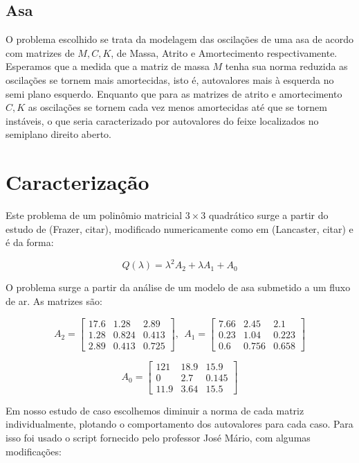 \documentclass[10pt,journal,compsoc]{IEEEtran}
\begin{document}
\subsection{Asa}
O problema escolhido se trata da modelagem das oscilações de uma asa de acordo com matrizes de $M,C,K$, de Massa, Atrito e Amortecimento respectivamente. Esperamos que a medida que a matriz de massa $M$ tenha sua norma reduzida as oscilações se tornem mais amortecidas, isto é, autovalores mais à esquerda no semi plano esquerdo. Enquanto que para as matrizes de atrito e amortecimento $C,K$ as oscilações se tornem cada vez menos amortecidas até que se tornem instáveis, o que seria caracterizado por autovalores do feixe localizados no semiplano direito aberto.


\section{Caracterização}
Este problema de um polinômio matricial $3\times3$ quadrático surge a partir do estudo de (Frazer, citar), modificado numericamente como em (Lancaster, citar) e é da forma:

\[
Q(\lambda) = \lambda^2A_2 + \lambda A_1 + A_0
\]

O problema surge a partir da análise de um modelo de asa submetido a um fluxo de ar. As matrizes são:

\[
A_2 = \begin{bmatrix}
17.6 & 1.28 & 2.89\\
1.28 & 0.824 & 0.413\\
2.89 & 0.413 & 0.725
\end{bmatrix}
,~~
A_1 = \begin{bmatrix}
7.66 & 2.45 & 2.1 \\
0.23 & 1.04 & 0.223\\
0.6 & 0.756 & 0.658
\end{bmatrix}
\]

\[
A_0 = \begin{bmatrix}
121 & 18.9 & 15.9\\
0 & 2.7 & 0.145 \\
11.9 & 3.64 & 15.5
\end{bmatrix}
\]

Em nosso estudo de caso escolhemos diminuir a norma de cada matriz individualmente, plotando o comportamento dos autovalores para cada caso. Para isso foi usado o script fornecido pelo professor José Mário, com algumas modificações:
\end{document}
